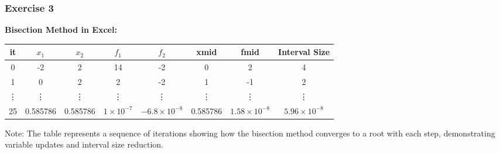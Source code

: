 \begin{frame}[fragile]
  \frametitle{Exercise 3}

  \textbf{Bisection Method in Excel:}
  \begin{table}[]
    \begin{tabular}{|c|c|c|c|c|c|c|c|}
      \hline
      it     & \(x_1\)  & \(x_2\)  & \(f_1\)              & \(f_2\)                 & xmid     & fmid                    & Interval Size           \\
      \hline
      0      & -2       & 2        & 14                   & -2                      & 0        & 2                       & 4                       \\
      1      & 0        & 2        & 2                    & -2                      & 1        & -1                      & 2                       \\
      \vdots & \vdots   & \vdots   & \vdots               & \vdots                  & \vdots   & \vdots                  & \vdots                  \\
      25     & 0.585786 & 0.585786 & \(1 \times 10^{-7}\) & \(-6.8 \times 10^{-8}\) & 0.585786 & \(1.58 \times 10^{-8}\) & \(5.96 \times 10^{-8}\) \\
      \hline
    \end{tabular}
  \end{table}

  Note: The table represents a sequence of iterations showing how the bisection method converges to a root with each step, demonstrating variable updates and interval size reduction.

\end{frame}


